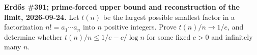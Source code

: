 \textbf{Erd\H{o}s \#391; prime-forced upper bound and reconstruction of the limit, 2026-09-24.}
Let $t(n)$ be the largest possible smallest factor in a factorization $n!=a_1\cdots a_n$ into $n$ positive integers. Prove $t(n)/n\to1/e$, and determine whether $t(n)/n\leq1/e-c/\log n$ for some fixed $c>0$ and infinitely many $n$.
